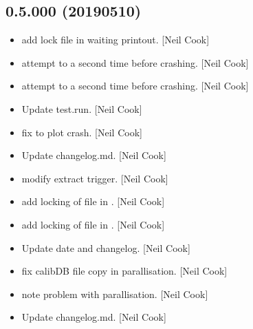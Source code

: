 \documentclass[a4paper,10pt,english]{report}
\begin{document}
\subsection{0.5.000 (2019\sphinxhyphen{}05\sphinxhyphen{}10)}
\label{\detokenize{misc/changelog:id155}}\begin{itemize}
\item {} 
 \sphinxhyphen{} add lock file in waiting printout. {[}Neil Cook{]}

\item {} 
 \sphinxhyphen{} attempt to  a second time before crashing.
{[}Neil Cook{]}

\item {} 
 \sphinxhyphen{} attempt to  a second time before crashing.
{[}Neil Cook{]}

\item {} 
Update test.run. {[}Neil Cook{]}

\item {} 
 \sphinxhyphen{} fix to plot crash. {[}Neil Cook{]}

\item {} 
Update changelog.md. {[}Neil Cook{]}

\item {} 
 \sphinxhyphen{} modify extract trigger. {[}Neil Cook{]}

\item {} 
 \sphinxhyphen{} add locking of file in . {[}Neil Cook{]}

\item {} 
 \sphinxhyphen{} add locking of file in . {[}Neil Cook{]}

\item {} 
Update date and changelog. {[}Neil Cook{]}

\item {} 
 \sphinxhyphen{} fix calibDB file copy in parallisation. {[}Neil Cook{]}

\item {} 
 \sphinxhyphen{} note problem with parallisation. {[}Neil Cook{]}

\item {} 
Update changelog.md. {[}Neil Cook{]}


\end{itemize}
\end{document}
